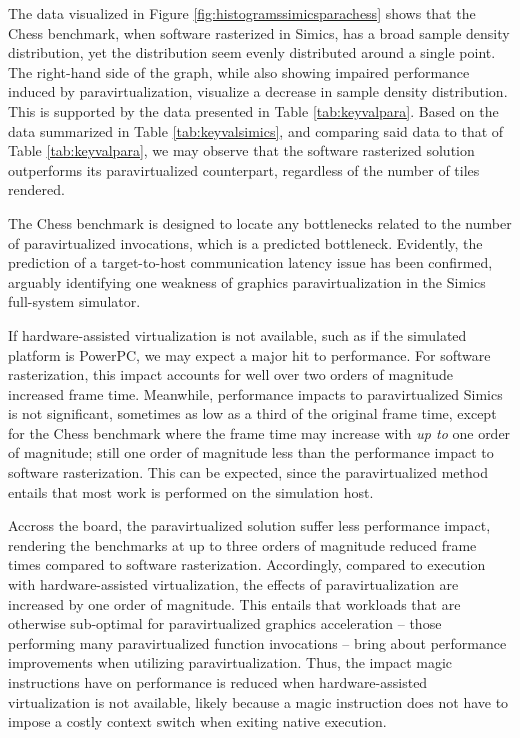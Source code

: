 The data visualized in Figure \ref{fig:histogramssimicsparachess} shows that the Chess benchmark, when software rasterized in Simics, has a broad sample density distribution, yet the distribution seem evenly distributed around a single point.
The right-hand side of the graph, while also showing impaired performance induced by paravirtualization, visualize a decrease in sample density distribution.
This is supported by the data presented in Table \ref{tab:keyvalpara}.
Based on the data summarized in Table \ref{tab:keyvalsimics}, and comparing said data to that of Table \ref{tab:keyvalpara}, we may observe that the software rasterized solution outperforms its paravirtualized counterpart, regardless of the number of tiles rendered.

The Chess benchmark is designed to locate any bottlenecks related to the number of paravirtualized invocations, which is a predicted bottleneck.
Evidently, the prediction of a target-to-host communication latency issue has been confirmed, arguably identifying one weakness of graphics paravirtualization in the Simics full-system simulator.

If hardware-assisted virtualization is not available, such as if the simulated platform is PowerPC, we may expect a major hit to performance.
For software rasterization, this impact accounts for well over two orders of magnitude increased frame time.
Meanwhile, performance impacts to paravirtualized Simics is not significant, sometimes as low as a third of the original frame time, except for the Chess benchmark where the frame time may increase with \textit{up to} one order of magnitude; still one order of magnitude less than the performance impact to software rasterization.
This can be expected, since the paravirtualized method entails that most work is performed on the simulation host.

Accross the board, the paravirtualized solution suffer less performance impact, rendering the benchmarks at up to three orders of magnitude reduced frame times compared to software rasterization.
Accordingly, compared to execution with hardware-assisted virtualization, the effects of paravirtualization are increased by one order of magnitude.
This entails that workloads that are otherwise sub-optimal for paravirtualized graphics acceleration -- those performing many paravirtualized function invocations -- bring about performance improvements when utilizing paravirtualization.
Thus, the impact magic instructions have on performance is reduced when hardware-assisted virtualization is not available, likely because a magic instruction does not have to impose a costly context switch when exiting native execution.

